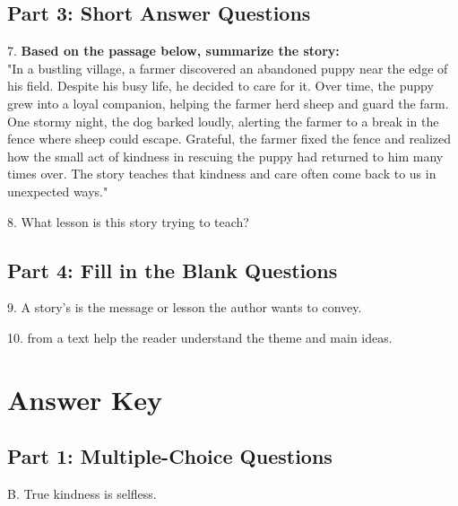 \documentclass[12pt]{article}
\begin{document}
\newpage

\subsection*{Part 3: Short Answer Questions}

7. \textbf{Based on the passage below, summarize the story: }\\
"In a bustling village, a farmer discovered an abandoned puppy near the edge of his field. Despite his busy life, he decided to care for it. Over time, the puppy grew into a loyal companion, helping the farmer herd sheep and guard the farm. One stormy night, the dog barked loudly, alerting the farmer to a break in the fence where sheep could escape. Grateful, the farmer fixed the fence and realized how the small act of kindness in rescuing the puppy had returned to him many times over. The story teaches that kindness and care often come back to us in unexpected ways."\\
\vspace{3cm}

8. What lesson is this story trying to teach?\\
\vspace{4cm}

\subsection*{Part 4: Fill in the Blank Questions}

\vspace{1cm}
9. A story’s  \underline{\hspace{4cm}} is the message or lesson the author wants to convey.

\vspace{3cm}

10.  \underline{\hspace{4cm}}from a text help the reader understand the theme and main ideas.

\section*{Answer Key}

\subsection*{Part 1: Multiple-Choice Questions}

B. True kindness is selfless.
\end{document}
